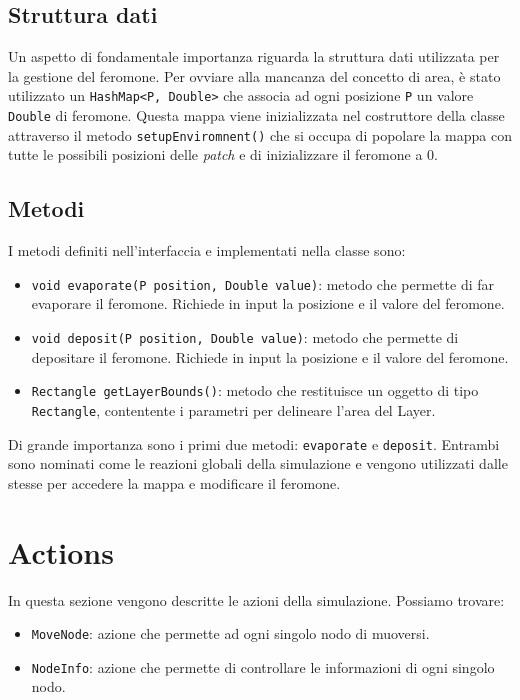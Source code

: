\subsection{Struttura dati}\label{strDati}
Un aspetto di fondamentale importanza riguarda la struttura dati utilizzata per la gestione del feromone.
Per ovviare alla mancanza del concetto di area, è stato utilizzato un \texttt{HashMap<P, Double>} che associa ad ogni posizione \texttt{P} un valore \texttt{Double} di feromone.
Questa mappa viene inizializzata nel costruttore della classe attraverso il metodo \texttt{setupEnviromnent()} che si occupa di popolare la mappa
con tutte le possibili posizioni delle \textit{patch} e di inizializzare il feromone a 0.\newline



\subsection{Metodi}
I metodi definiti nell'interfaccia e implementati nella classe sono:
\begin{itemize}
    \item \texttt{void evaporate(P position, Double value)}: metodo che permette di far evaporare il feromone. 
    Richiede in input la posizione e il valore del feromone.
    \item \texttt{void deposit(P position, Double value)}: metodo che permette di depositare il feromone.
     Richiede in input la posizione e il valore del feromone.
    \item \texttt{Rectangle getLayerBounds()}: metodo che restituisce un oggetto di tipo \texttt{Rectangle}, contentente i parametri per delineare l'area del Layer.
\end{itemize}
Di grande importanza sono i primi due metodi: \texttt{evaporate} e \texttt{deposit}.
Entrambi sono nominati come le reazioni globali della simulazione e vengono utilizzati dalle stesse per accedere la mappa e modificare il feromone.\newline


\section{Actions}
In questa sezione vengono descritte le azioni della simulazione. Possiamo trovare:
\begin{itemize}
    \item \texttt{MoveNode}: azione che permette ad ogni singolo nodo di muoversi.
    \item \texttt{NodeInfo}: azione che permette di controllare le informazioni di ogni singolo nodo.
\end{itemize}


